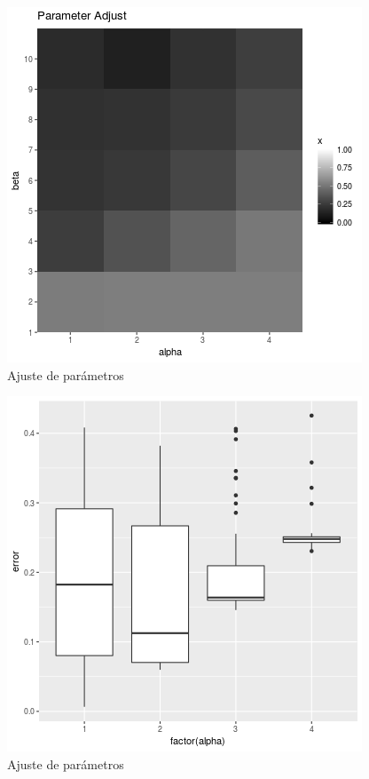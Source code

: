 \documentclass[conference,compsoc,a4paper]{IEEEtran}
\begin{document}
\begin{figure}
	\includegraphics[width=\linewidth]{param_adjust.png} %
	\caption{Ajuste de parámetros} %
	\label{fig:ajuste1} %
\end{figure}

\begin{figure}
	\includegraphics[width=\linewidth]{calibrate_complete_beta10_iter20000_tests50.png} %
	\caption{Ajuste de parámetros} %
	\label{fig:ajuste2} %
\end{figure}
\end{document}

